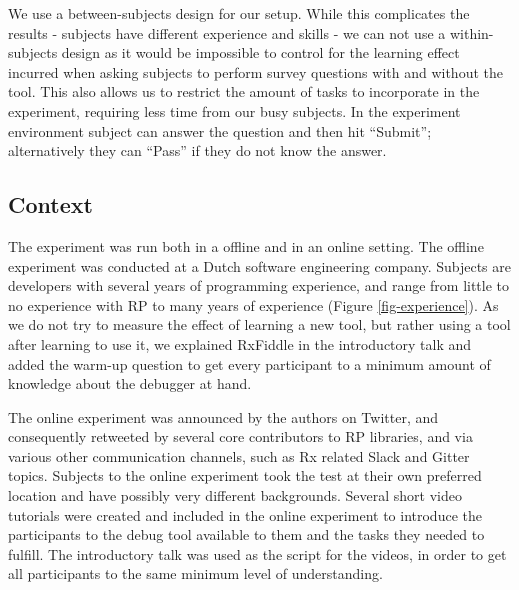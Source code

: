 We use a between-subjects design for our setup. While this complicates the results - subjects have different experience and skills - we can not use a within-subjects design as it would be impossible to control for the learning effect incurred when asking subjects to perform survey questions with and without the tool. This also allows us to restrict the amount of tasks to incorporate in the experiment, requiring less time from our busy subjects.
In the experiment environment subject can answer the question and then hit ``Submit''; alternatively they can ``Pass'' if they do not know the answer.


\subsection{Context}
The experiment was run both in a offline and in an online setting.
The offline experiment was conducted at a Dutch software engineering company. Subjects are developers with several years of programming experience, and range from little to no experience with RP to many years of experience (Figure \ref{fig-experience}).
As we do not try to measure the effect of learning a new tool, but rather using a tool after learning to use it, we explained RxFiddle in the introductory talk and added the warm-up question to get every participant to a minimum amount of knowledge about the debugger at hand.

The online experiment was announced by the authors on Twitter, and consequently retweeted by several core contributors to RP libraries, and via various other communication channels, such as Rx related Slack and Gitter topics. 
Subjects to the online experiment took the test at their own preferred location and have possibly very different backgrounds. Several short video tutorials were created and included in the online experiment to introduce the participants to the debug tool available to them and the tasks they needed to fulfill. The introductory talk was used as the script for the videos, in order to get all participants to the same minimum level of understanding.

